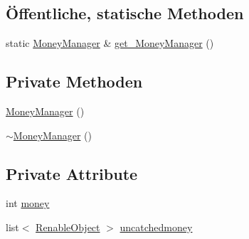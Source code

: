 \subsection*{Öffentliche, statische Methoden}
\begin{DoxyCompactItemize}
\item 
static \hyperlink{class_money_manager}{Money\-Manager} \& \hyperlink{class_money_manager_a9e244a12805cbff0dee7f76d1ca8c05a}{get\-\_\-\-Money\-Manager} ()
\end{DoxyCompactItemize}
\subsection*{Private Methoden}
\begin{DoxyCompactItemize}
\item 
\hyperlink{class_money_manager_a7fad6a5fe1cf45b6d670b898ff5a54de}{Money\-Manager} ()
\item 
\hyperlink{class_money_manager_ac2a9e2cf428e0838a856724f2c442501}{$\sim$\-Money\-Manager} ()
\end{DoxyCompactItemize}
\subsection*{Private Attribute}
\begin{DoxyCompactItemize}
\item 
int \hyperlink{class_money_manager_aa396ea903542470a382c2054f1e40dd8}{money}
\item 
list$<$ \hyperlink{class_renable_object}{Renable\-Object} $>$ \hyperlink{class_money_manager_a803e15bb98cf698f1ad15da4c86f1194}{uncatchedmoney}
\end{DoxyCompactItemize}


